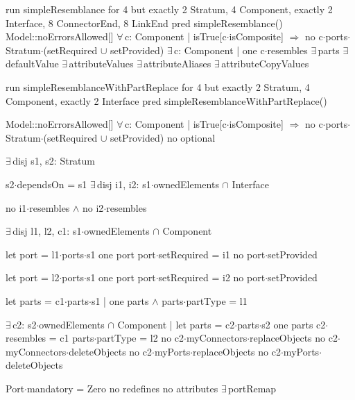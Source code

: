 run simpleResemblance for 4 but exactly 2 Stratum, 4 Component, exactly 2 Interface, 8 ConnectorEnd, 8 LinkEnd
pred simpleResemblance()
{
  Model::noErrorsAllowed[]
  $\forall\,$c: Component |
    isTrue[c$\cdot$isComposite] $\Longrightarrow$ no c$\cdot$ports$\cdot$Stratum$\cdot$(setRequired $\cup$ setProvided)
  $\exists\,$c: Component | one c$\cdot$resembles
  $\exists\,$parts
  $\exists\,$defaultValue
  $\exists\,$attributeValues
  $\exists\,$attributeAliases
  $\exists\,$attributeCopyValues
}

run simpleResemblanceWithPartReplace for 4 but exactly 2 Stratum, 4 Component, exactly 2 Interface
pred simpleResemblanceWithPartReplace()
{
  Model::noErrorsAllowed[]
  $\forall\,$c: Component |
    isTrue[c$\cdot$isComposite] $\Longrightarrow$ no c$\cdot$ports$\cdot$Stratum$\cdot$(setRequired $\cup$ setProvided)
  no optional
  
  $\exists\,$disj s1, s2: Stratum
  {
    s2$\cdot$dependsOn = s1
    $\exists\,$disj i1, i2: s1$\cdot$ownedElements $\cap$ Interface
    {
      no i1$\cdot$resembles $\wedge$ no i2$\cdot$resembles
      
      $\exists\,$disj l1, l2, c1: s1$\cdot$ownedElements $\cap$ Component
      {
        let port = l1$\cdot$ports$\cdot$s1
        {
          one port
          port$\cdot$setRequired = i1
          no port$\cdot$setProvided
        }

        let port = l2$\cdot$ports$\cdot$s1
        {
          one port
          port$\cdot$setRequired = i2
          no port$\cdot$setProvided
        }
        
        let parts = c1$\cdot$parts$\cdot$s1 |
          one parts $\wedge$ parts$\cdot$partType = l1

        $\exists\,$c2: s2$\cdot$ownedElements $\cap$ Component | let parts = c2$\cdot$parts$\cdot$s2
        {
          one parts
          c2$\cdot$resembles = c1
          parts$\cdot$partType = l2
          no c2$\cdot$myConnectors$\cdot$replaceObjects
          no c2$\cdot$myConnectors$\cdot$deleteObjects
          no c2$\cdot$myPorts$\cdot$replaceObjects
          no c2$\cdot$myPorts$\cdot$deleteObjects
        }
      }      
    }
  }
  Port$\cdot$mandatory = Zero
  no redefines
  no attributes
  $\exists\,$portRemap
}

